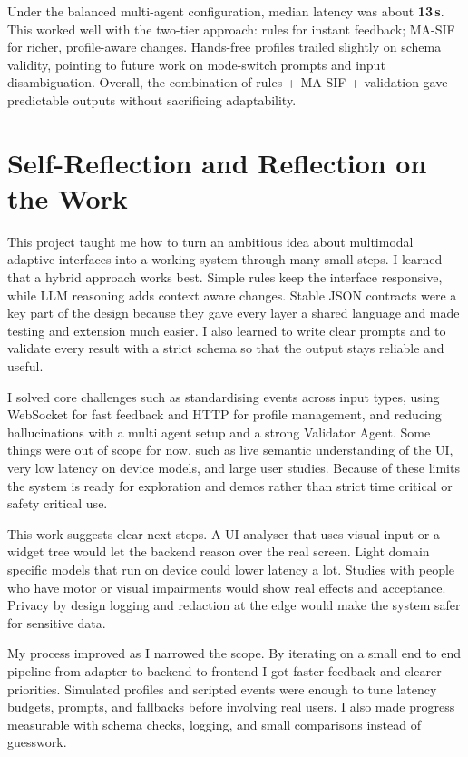 \documentclass[openany]{book}
\begin{document}
Under the balanced multi-agent configuration, median latency was about \textbf{13\,s}. This worked well with the two-tier approach: rules for instant feedback; MA-SIF for richer, profile-aware changes. Hands-free profiles trailed slightly on schema validity, pointing to future work on mode-switch prompts and input disambiguation. Overall, the combination of rules + MA-SIF + validation gave predictable outputs without sacrificing adaptability.

\section{Self-Reflection and Reflection on the Work}

This project taught me how to turn an ambitious idea about multimodal adaptive interfaces into a working system through many small steps. I learned that a hybrid approach works best. Simple rules keep the interface responsive, while LLM reasoning adds context aware changes. Stable JSON contracts were a key part of the design because they gave every layer a shared language and made testing and extension much easier. I also learned to write clear prompts and to validate every result with a strict schema so that the output stays reliable and useful.

I solved core challenges such as standardising events across input types, using WebSocket for fast feedback and HTTP for profile management, and reducing hallucinations with a multi agent setup and a strong Validator Agent. Some things were out of scope for now, such as live semantic understanding of the UI, very low latency on device models, and large user studies. Because of these limits the system is ready for exploration and demos rather than strict time critical or safety critical use.

This work suggests clear next steps. A UI analyser that uses visual input or a widget tree would let the backend reason over the real screen. Light domain specific models that run on device could lower latency a lot. Studies with people who have motor or visual impairments would show real effects and acceptance. Privacy by design logging and redaction at the edge would make the system safer for sensitive data.

My process improved as I narrowed the scope. By iterating on a small end to end pipeline from adapter to backend to frontend I got faster feedback and clearer priorities. Simulated profiles and scripted events were enough to tune latency budgets, prompts, and fallbacks before involving real users. I also made progress measurable with schema checks, logging, and small comparisons instead of guesswork.
\end{document}
